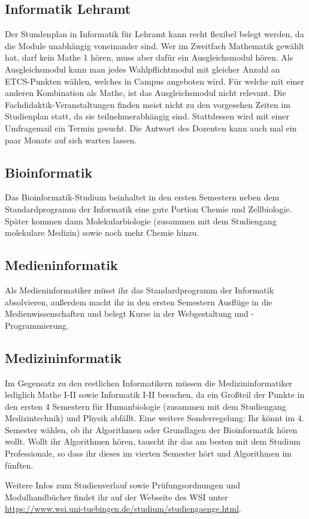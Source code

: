 \subsection*{Informatik Lehramt}
	
\pagebreak 
Der Stundenplan in Informatik für Lehramt kann recht flexibel belegt werden, da die Module unabhängig voneinander sind. Wer im Zweitfach Mathematik gewählt hat, darf kein Mathe 1 hören, muss aber dafür ein Ausgleichsmodul hören. Als Ausgleichsmodul kann man jedes Wahlpflichtmodul mit gleicher Anzahl an ETCS-Punkten wählen, welches in Campus angeboten wird. Für welche mit einer anderen Kombination als Mathe, ist das Ausgleichsmodul nicht relevant. Die Fachdidaktik-Veranstaltungen finden meist nicht zu den vorgesehen Zeiten im Studienplan statt, da sie teilnehmerabhängig sind. Stattdessen wird mit einer Umfragemail ein Termin gesucht. Die Antwort des Dozenten kann auch mal ein paar Monate auf sich warten lassen.

\subsection*{Bioinformatik}
	
Das Bioinformatik-Studium beinhaltet in den ersten Semestern neben dem Standardprogramm der Informatik eine gute Portion Chemie und Zellbiologie. Später kommen dann Molekularbiologie (zusammen mit dem Studiengang molekulare Medizin) sowie noch mehr Chemie hinzu.
\pagebreak 
\subsection*{Medieninformatik}
	
Als Medieninformatiker müsst ihr das Standardprogramm der Informatik absolvieren, außerdem macht ihr in den ersten Semestern Ausflüge in die Medienwissenschaften und belegt Kurse in der Webgestaltung und -Programmierung.
\subsection*{Medizininformatik}
	
Im Gegensatz zu den restlichen Informatikern müssen die Medizininformatiker lediglich Mathe I-II sowie Informatik I-II besuchen, da ein Großteil der Punkte in den ersten 4 Semestern für Humanbiologie (zusammen mit dem Studiengang Medizintechnik) und Physik abfällt. Eine weitere Sonderregelung: Ihr könnt im 4. Semester wählen, ob ihr Algorithmen oder Grundlagen der Bioinformatik hören wollt. Wollt ihr Algorithmen hören, tauscht ihr das am besten mit dem Studium Professionale, so dass ihr dieses im vierten Semester hört und Algorithmen im fünften.

Weitere Infos zum Studienverlauf sowie Prüfungsordnungen und Modulhandbücher findet ihr auf der Webseite des WSI unter \url{https://www.wsi.uni-tuebingen.de/studium/studiengaenge.html}.
\pagebreak